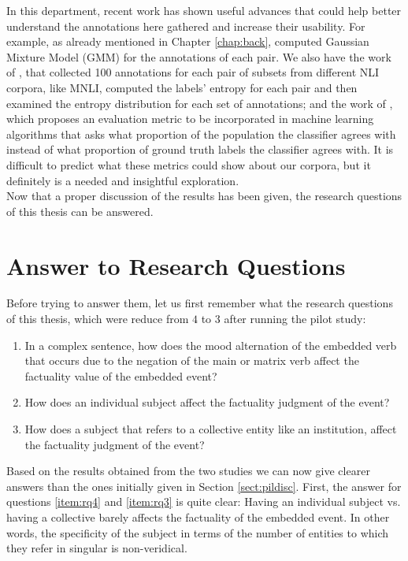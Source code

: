 In this department, recent work has shown useful advances that could help better understand the annotations here gathered and increase their usability. For example, as already mentioned in Chapter \ref{chap:back}, \citet{pavlick2019inherent} computed Gaussian Mixture Model (GMM) for the annotations of each pair. We also have the work of \citet{nie2020can}, that collected 100 annotations for each pair of subsets from different NLI corpora, like MNLI, computed the labels' entropy for each pair and then examined the entropy distribution for each set of annotations; and the work of \citet{gordon2021disagreement}, which proposes an evaluation metric to be incorporated in machine learning algorithms that asks what proportion of the population the classifier agrees with instead of what proportion of ground truth labels the classifier agrees with. It is difficult to predict what these metrics could show about our corpora, but it definitely is a needed and insightful exploration. \\

Now that a proper discussion of the results has been given, the research questions of this thesis can be answered.\\

\section{Answer to Research Questions}
Before trying to answer them, let us first remember what the research questions of this thesis, which were reduce from $4$ to $3$ after running the pilot study:\\

\begin{enumerate}[RQ1.-]
        \item In a complex sentence, how does the mood alternation of the embedded verb that occurs due to the negation of the main or matrix verb affect the factuality value of the embedded event?\label{item:rq1}
        \item How does an individual subject affect the factuality judgment of the event?\label{item:rq3}
        \item How does a subject that refers to a collective entity like an institution, affect the factuality judgment of the event?\label{item:rq4}
\end{enumerate}

Based on the results obtained from the two studies we can now give clearer answers than the ones initially given in Section \ref{sect:pildisc}. First, the answer for questions \ref{item:rq4} and \ref{item:rq3} is quite clear: Having an individual subject vs. having a collective barely affects the factuality of the embedded event. In other words, the specificity of the subject in terms of the number of entities to which they refer in singular is non-veridical.\\

